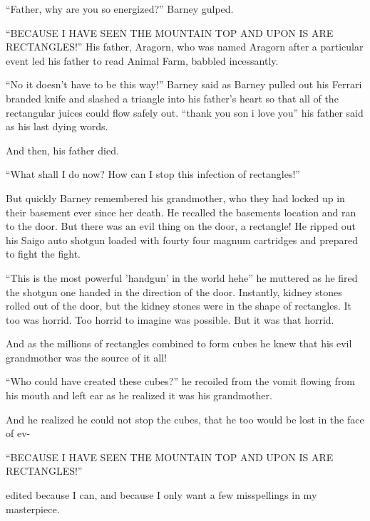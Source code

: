 ``Father, why are you so energized?'' Barney gulped.

``BECAUSE I HAVE SEEN THE MOUNTAIN TOP AND UPON IS ARE RECTANGLES!''
His father, Aragorn, who was named Aragorn after a particular event
led his father to read Animal Farm, babbled incessantly.

``No it doesn't have to be this way!'' Barney said as Barney pulled
out his Ferrari branded knife and slashed a triangle into his
father's heart so that all of the rectangular juices could flow
safely out. ``thank you son i love you'' his father said as his last
dying words.

And then, his father died.

``What shall I do now? How can I stop this infection of
rectangles!''

But quickly Barney remembered his grandmother, who they had locked
up in their basement ever since her death. He recalled the
basements location and ran to the door. But there was an evil thing
on the door, a rectangle! He ripped out his Saigo auto shotgun
loaded with fourty four magnum cartridges and prepared to fight the
fight.

``This is the most powerful 'handgun' in the world hehe'' he muttered
as he fired the shotgun one handed in the direction of the door.
Instantly, kidney stones rolled out of the door, but the kidney
stones were in the shape of rectangles. It too was horrid. Too
horrid to imagine was possible. But it was that horrid.

And as the millions of rectangles combined to form cubes he knew
that his evil grandmother was the source of it all!

``Who could have created these cubes?'' he recoiled from the vomit
flowing from his mouth and left ear as he realized it was his
grandmother.

And he realized he could not stop the cubes, that he too would be
lost in the face of ev-

``BECAUSE I HAVE SEEN THE MOUNTAIN TOP AND UPON IS ARE
RECTANGLES!''



edited because I can, and because I only want a few misspellings in
my masterpiece. 
 



